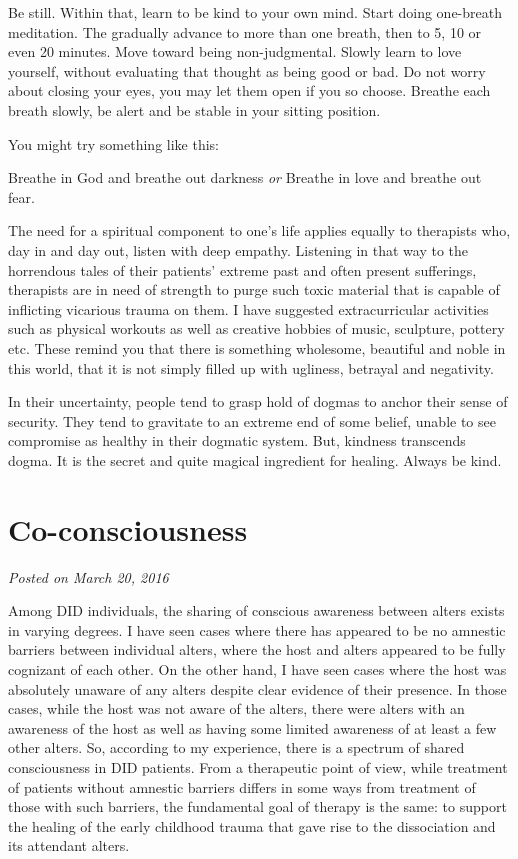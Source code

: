 \documentclass[]{book}
\begin{document}
Be still. Within that, learn to be kind to your own mind. Start doing one-breath meditation. The gradually advance to more than one breath, then to 5, 10 or even 20 minutes. Move toward being non-judgmental. Slowly learn to love yourself, without evaluating that thought as being good or bad. Do not worry about closing your eyes, you may let them open if you so choose. Breathe each breath slowly, be alert and be stable in your sitting position.

You might try something like this:

Breathe in God and breathe out darkness
\emph{or}
Breathe in love and breathe out fear.

The need for a spiritual component to one's life applies equally to therapists who, day in and day out, listen with deep empathy. Listening in that way to the horrendous tales of their patients' extreme past and often present sufferings, therapists are in need of strength to purge such toxic material that is capable of inflicting vicarious trauma on them. I have suggested extracurricular activities such as physical workouts as well as creative hobbies of music, sculpture, pottery etc. These remind you that there is something wholesome, beautiful and noble in this world, that it is not simply filled up with ugliness, betrayal and negativity.

In their uncertainty, people tend to grasp hold of dogmas to anchor their sense of security. They tend to gravitate to an extreme end of some belief, unable to see compromise as healthy in their dogmatic system. But, kindness transcends dogma. It is the secret and quite magical ingredient for healing. Always be kind.

\hypertarget{co-consciousness}{%
\section{Co-consciousness}\label{co-consciousness}}

\emph{Posted on March 20, 2016}

Among DID individuals, the sharing of conscious awareness between alters exists in varying degrees. I have seen cases where there has appeared to be no amnestic barriers between individual alters, where the host and alters appeared to be fully cognizant of each other. On the other hand, I have seen cases where the host was absolutely unaware of any alters despite clear evidence of their presence. In those cases, while the host was not aware of the alters, there were alters with an awareness of the host as well as having some limited awareness of at least a few other alters. So, according to my experience, there is a spectrum of shared consciousness in DID patients. From a therapeutic point of view, while treatment of patients without amnestic barriers differs in some ways from treatment of those with such barriers, the fundamental goal of therapy is the same: to support the healing of the early childhood trauma that gave rise to the dissociation and its attendant alters.
\end{document}
